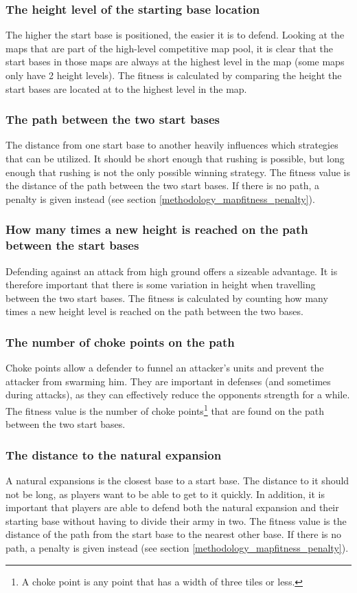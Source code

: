 	\subsubsection*{The height level of the starting base location}
	The higher the start base is positioned, the easier it is to defend. Looking at the maps that are part of the high-level competitive map pool, it is clear that the start bases in those maps are always at the highest level in the map (some maps only have 2 height levels). The fitness is calculated by comparing the height the start bases are located at to the highest level in the map. 

	\subsubsection*{The path between the two start bases}
	The distance from one start base to another heavily influences which strategies that can be utilized. It should be short enough that rushing is possible, but long enough that rushing is not the only possible winning strategy. The fitness value is the distance of the path between the two start bases. If there is no path, a penalty is given instead (see section \ref{methodology_mapfitness_penalty}).

	\subsubsection*{How many times a new height is reached on the path between the start bases}
	Defending against an attack from high ground offers a sizeable advantage. It is therefore important that there is some variation in height when travelling between the two start bases. The fitness is calculated by counting how many times a new height level is reached on the path between the two bases.

	\subsubsection*{The number of choke points on the path}
	Choke points allow a defender to funnel an attacker's units and prevent the attacker from swarming him. They are important in defenses (and sometimes during attacks), as they can effectively reduce the opponents strength for a while. The fitness value is the number of choke points\footnote{A choke point is any point that has a width of three tiles or less.} that are found on the path between the two start bases.

	\subsubsection*{The distance to the natural expansion}
	A natural expansions is the closest base to a start base. The distance to it should not be long, as players want to be able to get to it quickly. In addition, it is important that players are able to defend both the natural expansion and their starting base without having to divide their army in two. The fitness value is the distance of the path from the start base to the nearest other base. If there is no path, a penalty is given instead (see section \ref{methodology_mapfitness_penalty}).

